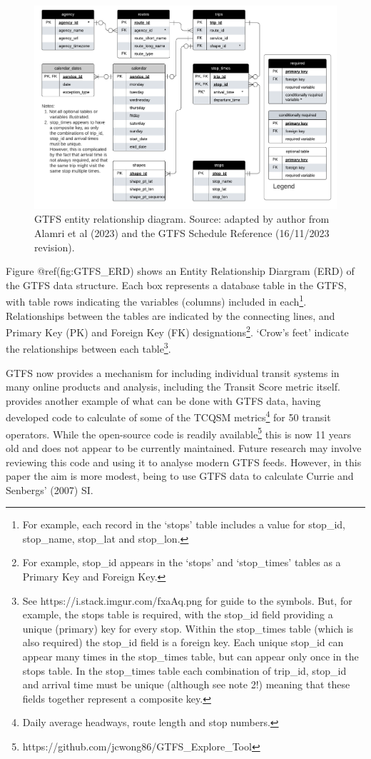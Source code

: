 \documentclass[preprint, 3p,
authoryear]{elsarticle} %
\begin{document}
\begin{figure}
\includegraphics[width=1\linewidth]{graphics/GTFS} \caption{GTFS entity relationship diagram. Source: adapted by author from Alamri et al (2023) and the GTFS Schedule Reference (16/11/2023 revision).}\label{fig:GTFS_ERD}
\end{figure}

Figure @ref(fig:GTFS\_ERD) shows an Entity Relationship Diargram (ERD)
of the GTFS data structure. Each box represents a database table in the
GTFS, with table rows indicating the variables (columns) included in
each\footnote{ For example, each record in the `stops' table includes a
  value for stop\_id, stop\_name, stop\_lat and stop\_lon.}.
Relationships between the tables are indicated by the connecting lines,
and Primary Key (PK) and Foreign Key (FK) designations\footnote{ For
  example, stop\_id appears in the `stops' and `stop\_times' tables as a
  Primary Key and Foreign Key.}. `Crow's feet' indicate the
relationships between each table\footnote{ See
  https://i.stack.imgur.com/fxaAq.png for guide to the symbols. But, for
  example, the stops table is required, with the stop\_id field
  providing a unique (primary) key for every stop. Within the
  stop\_times table (which is also required) the stop\_id field is a
  foreign key. Each unique stop\_id can appear many times in the
  stop\_times table, but can appear only once in the stops table. In the
  stop\_times table each combination of trip\_id, stop\_id and arrival
  time must be unique (although see note 2!) meaning that these fields
  together represent a composite key.}.

GTFS now provides a mechanism for including individual transit systems
in many online products and analysis, including the Transit Score metric
itself. \citet{Wong:2013aa} provides another example of what can be done
with GTFS data, having developed code to calculate of some of the TCQSM
metrics\footnote{ Daily average headways, route length and stop numbers.}
for 50 transit operators. While the \citet{Wong:2013aa} open-source code
is readily available\footnote{
  https://github.com/jcwong86/GTFS\_Explore\_Tool} this is now 11 years
old and does not appear to be currently maintained. Future research may
involve reviewing this code and using it to analyse modern GTFS feeds.
However, in this paper the aim is more modest, being to use GTFS data to
calculate Currie and Senbergs' (2007) SI.
\end{document}
